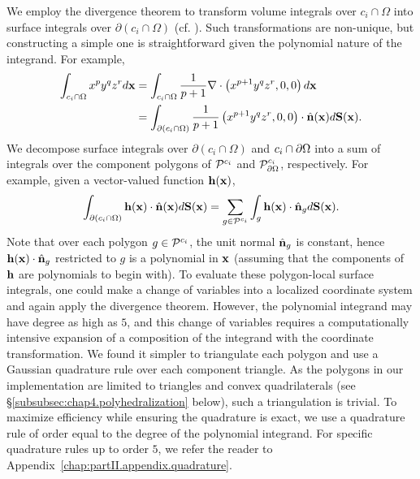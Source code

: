 We employ the divergence theorem to transform volume integrals over $c_i \cap \Omega$ into surface integrals over $\partial(c_i \cap \Omega)$ (cf. \cite{Min.Chohong07}). Such transformations are non-unique, but constructing a simple one is straightforward given the polynomial nature of the integrand. For example,
\begin{align*}
\int_{c_i \cap \Omega} x^p y^q z^r d\mathbf{x}
& = \int_{c_i \cap \Omega} \frac{1}{p+1} \nabla \cdot \left( x^{p+1} y^q z^r, 0, 0 \right) d\mathbf{x} \\
& = \int_{\partial(c_i \cap \Omega)} \frac{1}{p+1} \left( x^{p+1} y^q z^r, 0, 0 \right) \cdot \hat{\mathbf{n}}(\mathbf{x}) d\mathbf{S}(\mathbf{x}).
\end{align*}
We decompose surface integrals over $\partial(c_i \cap \Omega)$ and $c_i \cap \partial\Omega$ into a sum of integrals over the component polygons of $\mathcal{P}^{c_i}$ and $\mathcal{P}_{\partial\Omega}^{c_i}$, respectively. For example, given a vector-valued function $\mathbf{h}(\mathbf{x})$,
\begin{equation*}
\int_{\partial(c_i \cap \Omega)} \mathbf{h}(\mathbf{x}) \cdot \hat{\mathbf{n}}(\mathbf{x}) d\mathbf{S}(\mathbf{x}) = \sum_{g \in \mathcal{P}^{c_i}} \int_g \mathbf{h}(\mathbf{x}) \cdot \hat{\mathbf{n}}_g d\mathbf{S}(\mathbf{x}).
\end{equation*}
Note that over each polygon $g \in \mathcal{P}^{c_i}$, the unit normal $\hat{\mathbf{n}}_g$ is constant, hence $\mathbf{h}(\mathbf{x}) \cdot \hat{\mathbf{n}}_g$ restricted to $g$ is a polynomial in $\mathbf{x}$ (assuming that the components of $\mathbf{h}$ are polynomials to begin with). To evaluate these polygon-local surface integrals, one could make a change of variables into a localized coordinate system and again apply the divergence theorem. However, the polynomial integrand may have degree as high as $5$, and this change of variables requires a computationally intensive expansion of a composition of the integrand with the coordinate transformation. We found it simpler to triangulate each polygon and use a Gaussian quadrature rule over each component triangle. As the polygons in our implementation are limited to triangles and convex quadrilaterals (see \S\ref{subsubsec:chap4.polyhedralization} below), such a triangulation is trivial. To maximize efficiency while ensuring the quadrature is exact, we use a quadrature rule of order equal to the degree of the polynomial integrand. For specific quadrature rules up to order $5$, we refer the reader to Appendix~\ref{chap:partII.appendix.quadrature}.

